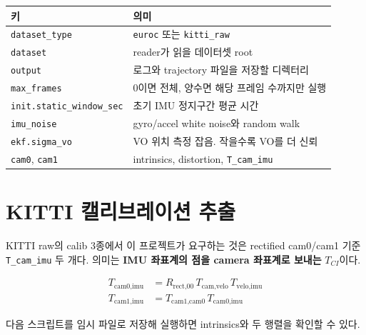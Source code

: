 \documentclass[11pt,a4paper,oneside]{report}
\begin{document}
\begin{longtable}{p{}p{}}
\toprule
키 & 의미 \\
\midrule
\texttt{dataset\_type} & \texttt{euroc} 또는 \texttt{kitti\_raw} \\
\texttt{dataset} & reader가 읽을 데이터셋 root \\
\texttt{output} & 로그와 trajectory 파일을 저장할 디렉터리 \\
\texttt{max\_frames} & 0이면 전체, 양수면 해당 프레임 수까지만 실행 \\
\texttt{init.static\_window\_sec} & 초기 IMU 정지구간 평균 시간 \\
\texttt{imu\_noise} & gyro/accel white noise와 random walk \\
\texttt{ekf.sigma\_vo} & VO 위치 측정 잡음. 작을수록 VO를 더 신뢰 \\
\texttt{cam0}, \texttt{cam1} & intrinsics, distortion, \texttt{T\_cam\_imu} \\
\bottomrule
\end{longtable}

\section{KITTI 캘리브레이션 추출}

KITTI raw의 calib 3종에서 이 프로젝트가 요구하는 것은 rectified cam0/cam1 기준
\texttt{T\_cam\_imu} 두 개다. 의미는 \textbf{IMU 좌표계의 점을 camera 좌표계로 보내는}
\(T_{CI}\)이다.

\begin{align*}
T_{\text{cam0,imu}} &= R_{\text{rect,00}} \, T_{\text{cam,velo}} \, T_{\text{velo,imu}} \\
T_{\text{cam1,imu}} &= T_{\text{cam1,cam0}} \, T_{\text{cam0,imu}}
\end{align*}

다음 스크립트를 임시 파일로 저장해 실행하면 intrinsics와 두 행렬을 확인할 수 있다.
\end{document}
